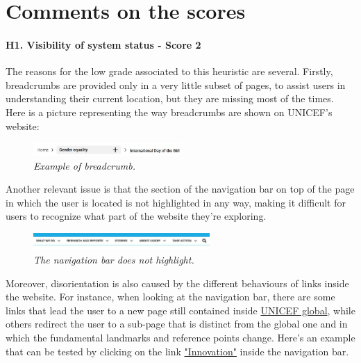 \endgroup


\clearpage



\section*{Comments on the scores}
\paragraph{H1. Visibility of system status - Score 2} \label{subsec:H1}	
The reasons for the low grade associated to this heuristic are several. Firstly, breadcrumbs are provided only in a very little subset of pages, to assist users in understanding their current location, but they are missing most of the times. Here is a picture representing the way breadcrumbs are shown on UNICEF's website:
\begin{figure}[!h]
	\begin{center}
		\includegraphics[width=0.5\textwidth]{FinalScores1.jpg}
		\captionsetup{font=small}
		\caption{\textit{Example of breadcrumb.}}
	\end{center}
\end{figure}
\newline Another relevant issue is that the section of the navigation bar on top of the page in which the user is located is not highlighted in any way, making it difficult for users to recognize what part of the website they're exploring.
\begin{figure}[!h]
	\begin{center}
		\includegraphics[width=0.6\textwidth]{FinalScores2.jpg}
		\captionsetup{font=small}
		\caption{\textit{The navigation bar does not highlight.}}
	\end{center}
\end{figure}
\newline
Moreover, disorientation is also caused by the different behaviours of links inside the website. For instance, when looking at the navigation bar, there are some links that lead the user to a new page still contained inside \href{https://www.unicef.org/}{UNICEF global}, while others redirect the user to a sub-page that is distinct from the global one and in which the fundamental landmarks and reference points change. Here's an example that can be tested by clicking on the link \href{https://www.unicef.org/innovation/}{"Innovation"} inside the navigation bar.
